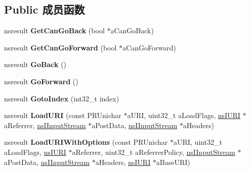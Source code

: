 \subsection*{Public 成员函数}
\begin{DoxyCompactItemize}
\item 
\mbox{\label{interfacens_i_web_navigation_a25e3a373668b3f3a66b773b9232d1399}} 
nsresult {\bfseries Get\+Can\+Go\+Back} (bool $\ast$a\+Can\+Go\+Back)
\item 
\mbox{\label{interfacens_i_web_navigation_ad1e4bd08e831a422d588228fdcb6aef6}} 
nsresult {\bfseries Get\+Can\+Go\+Forward} (bool $\ast$a\+Can\+Go\+Forward)
\item 
\mbox{\label{interfacens_i_web_navigation_a731b825698e3f13a69c509ed1d4a944d}} 
nsresult {\bfseries Go\+Back} ()
\item 
\mbox{\label{interfacens_i_web_navigation_a3939b357e3d109b4685c930b02c0b373}} 
nsresult {\bfseries Go\+Forward} ()
\item 
\mbox{\label{interfacens_i_web_navigation_a079eb4408a8cda72f384d5fb6decad07}} 
nsresult {\bfseries Goto\+Index} (int32\+\_\+t index)
\item 
\mbox{\label{interfacens_i_web_navigation_a6ce422bda81f8af3626f989c251ede88}} 
nsresult {\bfseries Load\+U\+RI} (const P\+R\+Unichar $\ast$a\+U\+RI, uint32\+\_\+t a\+Load\+Flags, \hyperlink{interfacens_i_u_r_i}{ns\+I\+U\+RI} $\ast$a\+Referrer, \hyperlink{interfacens_i_input_stream}{ns\+I\+Input\+Stream} $\ast$a\+Post\+Data, \hyperlink{interfacens_i_input_stream}{ns\+I\+Input\+Stream} $\ast$a\+Headers)
\item 
\mbox{\label{interfacens_i_web_navigation_a741e37120c30207b7b3e78469d0e3d9b}} 
nsresult {\bfseries Load\+U\+R\+I\+With\+Options} (const P\+R\+Unichar $\ast$a\+U\+RI, uint32\+\_\+t a\+Load\+Flags, \hyperlink{interfacens_i_u_r_i}{ns\+I\+U\+RI} $\ast$a\+Referrer, uint32\+\_\+t a\+Referrer\+Policy, \hyperlink{interfacens_i_input_stream}{ns\+I\+Input\+Stream} $\ast$a\+Post\+Data, \hyperlink{interfacens_i_input_stream}{ns\+I\+Input\+Stream} $\ast$a\+Headers, \hyperlink{interfacens_i_u_r_i}{ns\+I\+U\+RI} $\ast$a\+Base\+U\+RI)

\end{DoxyCompactItemize}
